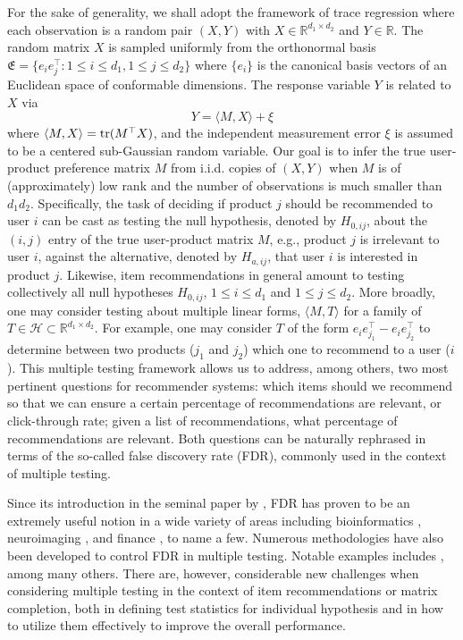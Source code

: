 \documentclass[12pt]{article}
\newcommand{\tr}{{\rm tr}}
\newcommand{\R}{\mathbb{R}}
\newcommand{\cH}{\mathcal{H}}
\theoremstyle{plain}
\begin{document}
\begin{sloppypar}
For the sake of generality, we shall adopt the framework of trace regression where each observation is a random pair $(X,Y)$ with $X\in\R^{d_1\times d_2}$ and $Y\in\R$. The random matrix $X$ is sampled uniformly from the orthonormal basis $\mathfrak{E}=\{e_{i}e_{j}^{\top}: 1\le i\le d_1, 1\le j\le d_2\}$ where $\{e_{i}\}$ is the canonical basis vectors of an Euclidean space of conformable dimensions. The response variable $Y$ is related to $X$ via
\begin{equation}\label{eq:NMC}
	Y=\langle  M, X\rangle +\xi
\end{equation}
where $\langle M, X\rangle=\tr(M^{\top}X)$, and the independent measurement error $\xi$ is assumed to be a centered sub-Gaussian random variable. Our goal is to infer the true user-product preference matrix $M$ from i.i.d. copies of $(X,Y)$ when $M$ is of (approximately) low rank and the number of observations is much smaller than $d_1d_2$. Specifically, the task of deciding if product $j$ should be recommended to user $i$ can be cast as testing the null hypothesis, denoted by $H_{0,ij}$, about the $(i,j)$ entry of the true user-product matrix $M$, e.g., product $j$ is irrelevant to user $i$, against the alternative, denoted by $H_{a,ij}$, that user $i$ is interested in product $j$. Likewise, item recommendations in general amount to testing collectively all null hypotheses $H_{0,ij}$, $1\le i\le d_1$ and $1\le j\le d_2$. More broadly, one may consider testing about multiple linear forms, $\langle M,T \rangle$ for a family of $T\in \cH\subset \R^{d_1\times d_2}$. For example, one may consider $T$ of the form $e_ie_{j_1}^\top-e_ie_{j_2}^\top$ to determine between two products ($j_1$ and $j_2$) which one to recommend to a user ($i$). This multiple testing framework allows us to address, among others, two most pertinent questions for recommender systems: which items should we recommend so that we can ensure a certain percentage of recommendations are relevant, or click-through rate; given a list of recommendations, what percentage of recommendations are relevant. Both questions can be naturally rephrased in terms of the so-called false discovery rate (FDR), commonly used in the context of multiple testing. 

Since its introduction in the seminal paper by \cite{benjamini1995controlling}, FDR has proven to be an extremely useful notion in a wide variety of areas including bioinformatics \citep{jung2005sample,roeder2009genome,brzyski2017controlling}, neuroimaging \citep{perone2004false,chumbley2010topological}, and finance \citep{barras2010false,bajgrowicz2012technical}, to name a few. Numerous methodologies have also been developed to control FDR in multiple testing. Notable examples includes \cite{benjamini2001control,sarkar2002some,wu2008false,clarke2009robustness,barber2015controlling,candes2018panning,barber2019knockoff}, among many others. There are, however, considerable new challenges when considering multiple testing in the context of item recommendations or matrix completion, both in defining test statistics for individual hypothesis and in how to utilize them effectively to improve the overall performance.


\end{sloppypar}
\end{document}
